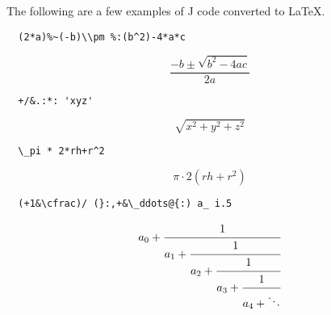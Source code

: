 \documentclass{article}
\begin{document}
The following are a few examples of J code converted to LaTeX.
\begin{lstlisting}
  (2*a)%~(-b)\\pm %:(b^2)-4*a*c
\end{lstlisting}
\[\frac{-b \pm \sqrt{b^2-4 a c}}{2 a}\]
\begin{lstlisting}
  +/&.:*: 'xyz'
\end{lstlisting}
\[\sqrt{x^2+y^2+z^2}\]
\begin{lstlisting}
  \_pi * 2*rh+r^2
\end{lstlisting}
\[\pi\cdot 2 \left(rh+r^2\right)\]
\begin{lstlisting}
  (+1&\cfrac)/ (}:,+&\_ddots@{:) a_ i.5
\end{lstlisting}
\[a_0+\cfrac{1}{a_1+\cfrac{1}{a_2+\cfrac{1}{a_3+\cfrac{1}{a_4+\ddots}}}}\]
\end{document}

